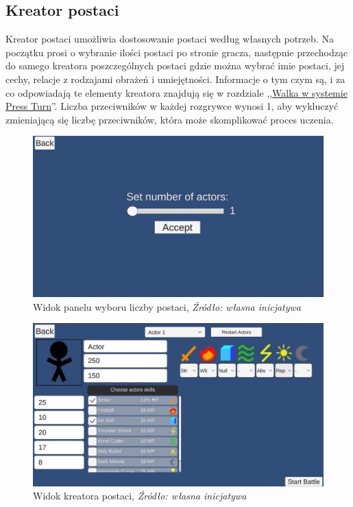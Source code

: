 \documentclass{SGGW-thesis}
\begin{document}
\subsection{Kreator postaci}
Kreator postaci umożliwia dostosowanie postaci według własnych potrzeb. Na początku prosi o wybranie ilości postaci po stronie gracza, następnie przechodząc do samego kreatora poszczególnych postaci gdzie można wybrać imie postaci, jej cechy, relacje z rodzajami obrażeń i umiejętności. 
Informacje o tym czym są, i za co odpowiadają te elementy kreatora znajdują się w rozdziale ,,\hyperref[systempressturn]{Walka w systemie Press Turn}''. Liczba przeciwników w każdej rozgrywce wynosi 1, aby wykluczyć zmieniającą się liczbę przeciwników, która może skomplikować proces uczenia.
\begin{figure}[H]
  \includegraphics[width=1\textwidth]{creatorscreen1.JPG}
  \caption{Widok panelu wyboru liczby postaci, \textit{Źródło: własna inicjatywa}}
\end{figure}
\begin{figure}[H]
  \includegraphics[width=1\textwidth]{creatorscreen2.JPG}
  \caption{Widok kreatora postaci, \textit{Źródło: własna inicjatywa}}
\end{figure}
\end{document}
